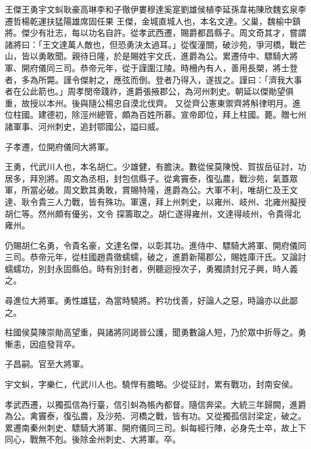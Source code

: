 
\begin{pinyinscope}

 王傑王勇宇文虯耿豪高琳李和子徹伊婁穆達奚寔劉雄侯植李延孫韋祐陳欣魏玄泉李遷哲楊乾運扶猛陽雄席固任果
 王傑，金城直城人也，本名文達。父巢，魏榆中鎮將。傑少有壯志，每以功名自許。從孝武西遷，賜爵都昌縣子。周文奇其才，嘗謂諸將曰：「王文達萬人敵也，但恐勇決太過耳。」從復潼關，破沙苑，爭河橋，戰芒山，皆以勇敢聞。親待日隆，於是賜姓宇文氏，進爵為公。累遷侍中、驃騎大將軍、開府儀同三司。恭帝元年，從于謹圍江陵。時柵內有人，善用長槊，將士登者，多為所斃。謹令傑射之，應弦而倒。登者乃得入，遂拔之。謹曰：「濟我大事者在公此箭也。」周孝閔帝踐祚，進爵張掖郡公，為河州刺史。朝延以傑勛望俱重，故授以本州。後與隨公楊忠自漠北伐齊。
 又從齊公憲東禦齊將斛律明月。進位柱國。建德初，除涇州總管，頗為百姓所慕。宣帝即位，拜上柱國。薨。贈七州諸軍事、河州刺史，追封鄂國公，謚曰威。



 子孝遷，位開府儀同大將軍。



 王勇，代武川人也，本名胡仁。少雄健，有膽決。數從侯莫陳悅、賀拔岳征討，功居多，拜別將。周文為丞相，封包信縣子。從禽竇泰，復弘農，戰沙苑，氣蓋眾軍，所當必破。周文歎其勇敢，賞賜特隆，進爵為公。大軍不利，唯胡仁及王文達、耿令貴三人力戰，皆有殊功。軍還，拜上州刺史，以雍州、岐州、北雍州擬授胡仁等。然州頗有優劣，文令
 探籌取之。胡仁遂得雍州，文達得岐州，令貴得北雍州。



 仍賜胡仁名勇，令貴名豪，文達名傑，以彰其功。進侍中、驃騎大將軍、開府儀同三司。恭帝元年，從柱國趙貴徵蠕蠕，破之，進爵新陽郡公，賜姓庫汗氏。又論討蠕蠕功，別封永固縣伯。時有別封者，例聽迴授次子，勇獨請封兄子興，時人義之。



 尋進位大將軍。勇性雄猛，為當時驍將。矜功伐善，好論人之惡，時論亦以此鄙之。



 柱國侯莫陳崇勛高望重，與諸將同謁晉公護，聞勇數論人短，乃於眾中折辱之。勇慚恚，因疽發背卒。



 子昌嗣。官至大將軍。



 宇文虯，字樂仁，代武川人也。驍悍有膽略。少從征討，累有戰功，封南安侯。



 孝武西遷，以獨孤信為行臺，信引虯為帳內都督。隨信奔梁。大統三年歸闕，進爵為公。禽竇泰，復弘農，及沙苑、河橋之戰，皆有功。又從獨孤信討梁定，破之。累遷南秦州刺史、驃騎大將軍、開府儀同三司。虯每經行陣，必身先士卒，故上下同心，戰無不剋。後除金州刺史、大將軍。卒。




\end{pinyinscope}
